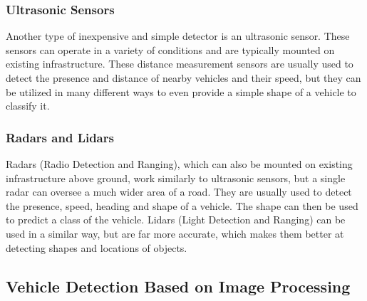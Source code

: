 \subsubsection*{Ultrasonic Sensors}

Another type of inexpensive and simple detector is an ultrasonic
sensor. \cite{UltrasonicSensors} These sensors can operate in a variety of
conditions and are typically mounted on existing infrastructure. These distance
measurement sensors are usually used to detect the presence and distance of nearby
vehicles and their speed, but they can be utilized in many different ways to
even provide a simple shape of a vehicle to classify it.


\subsubsection*{Radars and Lidars}

Radars (Radio Detection and Ranging), which can also be mounted on existing
infrastructure above ground, work similarly to ultrasonic sensors, but a single
radar can oversee a much wider area of a road. \cite{RadarSensors} They are
usually used to detect the presence, speed, heading and shape of a vehicle. The
shape can then be used to predict a class of the vehicle. Lidars (Light
Detection and Ranging) can be used in a similar way, but are far more accurate,
which makes them better at detecting shapes and locations of objects.



\subsection{Vehicle Detection Based on Image Processing}






